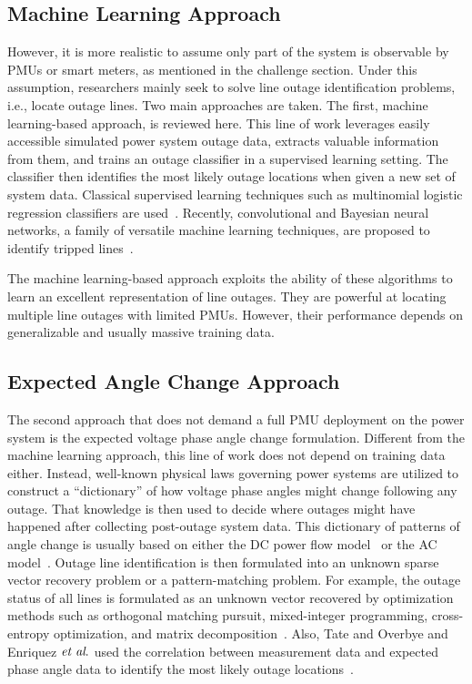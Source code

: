 \subsection{Machine Learning Approach}
However, it is more realistic to assume only part of the system is observable by PMUs or smart meters, as mentioned in the challenge section. Under this assumption, researchers mainly seek to solve line outage identification problems, i.e., locate outage lines. Two main approaches are taken. The first, machine learning-based approach, is reviewed here. This line of work leverages easily accessible simulated power system outage data, extracts valuable information from them, and trains an outage classifier in a supervised learning setting. The classifier then identifies the most likely outage locations when given a new set of system data. Classical supervised learning techniques such as multinomial logistic regression classifiers are used~\cite{Garcia2016,Kim2018}. Recently, convolutional and Bayesian neural networks, a family of versatile machine learning techniques, are proposed to identify tripped lines~\cite{Li2019a,Zhao2020}. 

The machine learning-based approach exploits the ability of these algorithms to learn an excellent representation of line outages. They are powerful at locating multiple line outages with limited PMUs. However, their performance depends on generalizable and usually massive training data.

\subsection{Expected Angle Change Approach}
The second approach that does not demand a full PMU deployment on the power system is the expected voltage phase angle change formulation. Different from the machine learning approach, this line of work does not depend on training data either. Instead, well-known physical laws governing power systems are utilized to construct a ``dictionary'' of how voltage phase angles might change following any outage. That knowledge is then used to decide where outages might have happened after collecting post-outage system data. This dictionary of patterns of angle change is usually based on either the DC power flow model~\cite{Tate2008,tate2009double,Zhu2012,Emami2013,Chen2014,Wu2015} or the AC model~\cite{Costilla-Enriquez2019}. Outage line identification is then formulated into an unknown sparse vector recovery problem or a pattern-matching problem. 
For example, the outage status of all lines is formulated as an unknown vector recovered by optimization methods such as orthogonal matching pursuit, mixed-integer programming, cross-entropy optimization, and matrix decomposition~\cite{Zhu2012, Emami2013,Chen2014,Wu2015}. Also, Tate and Overbye and Enriquez $\textit{et al}.$ used the correlation between measurement data and expected phase angle data to identify the most likely outage locations~\cite{Tate2008,Costilla-Enriquez2019}. 

